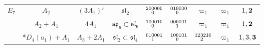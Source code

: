 \documentclass{amsart}
\theoremstyle{definition}
\newcommand{\0}{\mathcal{O}}
\begin{document}
\begin{table}[htp]
\begin{center}
\begin{tabular}{|c | c| c| c| c| c| c|c | c|}
				$E_7$ & $A_2$ & $(3A_1)'$ & $\mathfrak{sl}_2$ & $\scriptsize{\begin{aligned}20 &0000 \\[-1.8mm] &0\end{aligned}}$ & $\scriptsize{\begin{aligned}01 &0000 \\[-1.8mm] &0\end{aligned}}$ 
                & $\varpi_1$ & $\varpi_1$  
                & $1,\bf{2}$  \\

                & $A_2+A_1$ & $4A_1$ & $\mathfrak{sp}_6\subset\mathfrak{sl}_6$ & $\scriptsize{\begin{aligned}10 &0010 \\[-1.8mm] &0\end{aligned}}$ & $\scriptsize{\begin{aligned}00 &0001 \\[-1.8mm] &1\end{aligned}}$ 
                &  $\varpi_1$ 
                &  $\varpi_1$ 
                & $1,{\bf 2}$ \\  
                
				& *$D_4(a_1)+A_1$ & $A_3+2A_1$ & $\mathfrak{sl}_2\subset \mathfrak{sl}_4$ & $\scriptsize{\begin{aligned}01 &0001 \\[-1.8mm] &1\end{aligned}}$ & $\scriptsize{\begin{aligned}10 &0101 \\[-1.8mm] &0\end{aligned}}$ 
				& $\scriptsize{\begin{aligned}1 2 &3210 \\[-1.8mm] &2\end{aligned}}$ &  $\varpi_1$ 
                & $1,3,\bf{3}$  \\  
								 

\end{tabular}
\end{center}
\end{table}
\end{document}
